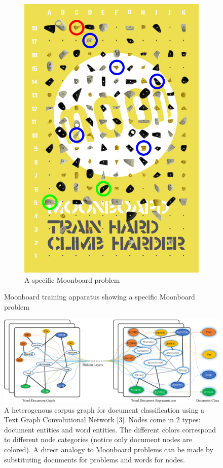 \documentclass{article}
\begin{document}
\begin{figure}
\begin{subfigure}{.48\textwidth}
  \includegraphics[width=.8\linewidth]{moonboard_1}
  \caption{A specific Moonboard problem}
  \label{fig: Moonboard Problem}
\end{subfigure}
\caption{Moonboard training apparatus showing a specific Moonboard problem}
\end{figure}

\begin{figure}
\centering
\includegraphics[width=.8\linewidth]{textGCN}
\caption{A heterogenous corpus graph for document classification using a Text Graph Convolutional Network [3]. Nodes come in 2 types: document entities and word entities. The different colors correspond to different node categories (notice only document nodes are colored). A direct analogy to Moonboard problems can be made by substituting documents for problems and words for nodes.}
\label{fig: Corpus graph for Text Graph Convolutional Network}
\end{figure}
\end{document}
